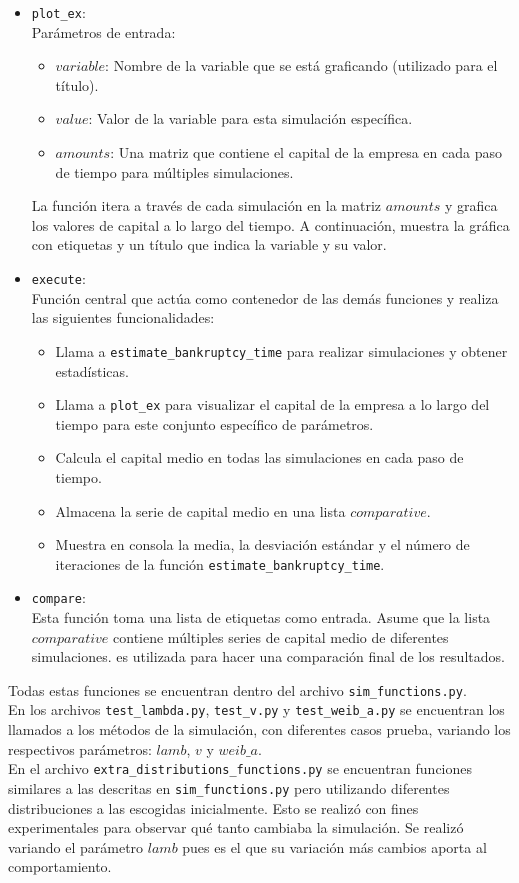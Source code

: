 \documentclass{article}
\begin{document}
\begin{itemize}
    \item \texttt{plot\_ex}: \\ 
         Parámetros de entrada:
         \begin{itemize}
            \item $variable$: Nombre de la variable que se está graficando (utilizado para el título).
            \item $value$: Valor de la variable para esta simulación específica.
            \item $amounts$: Una matriz que contiene el capital de la empresa en cada paso de tiempo para múltiples simulaciones.
         \end{itemize}
         La función itera a través de cada simulación en la matriz $amounts$ y grafica los valores de capital a lo largo del tiempo. A continuación, muestra la gráfica con etiquetas y un título que indica la variable y su valor.

    \item \texttt{execute}: \\
           Función central que actúa como contenedor de las demás funciones y realiza las siguientes funcionalidades: 
           \begin{itemize}
            \item Llama a \texttt{estimate\_bankruptcy\_time} para realizar simulaciones y obtener estadísticas.
            \item Llama a \texttt{plot\_ex} para visualizar el capital de la empresa a lo largo del tiempo para este conjunto específico de parámetros.
            \item Calcula el capital medio en todas las simulaciones en cada paso de tiempo.
            \item Almacena la serie de capital medio en una lista $comparative$.
            \item Muestra en consola la media, la desviación estándar y el número de iteraciones de la función \texttt{estimate\_bankruptcy\_time}.
           \end{itemize}
    \item \texttt{compare}: \\
    Esta función toma una lista de etiquetas como entrada. Asume que la lista $comparative$ contiene múltiples series de capital medio de diferentes simulaciones. es utilizada para hacer una comparación final de los resultados. 
 \end{itemize}
 Todas estas funciones se encuentran dentro del archivo \texttt{sim\_functions.py}.\\
 En los archivos \texttt{test\_lambda.py}, \texttt{test\_v.py} y \texttt{test\_weib\_a.py} se encuentran los llamados a los métodos de la simulación, con diferentes casos prueba, variando los respectivos parámetros: $lamb$, $v$ y $weib\_a$.\\
 En el archivo \texttt{extra\_distributions\_functions.py} se encuentran funciones similares a las descritas en \texttt{sim\_functions.py} pero utilizando diferentes distribuciones a las escogidas inicialmente. Esto se realizó con fines experimentales para observar qué tanto cambiaba la simulación. Se realizó variando el parámetro $lamb$ pues es el que su variación más cambios aporta al comportamiento. 
\end{document}
